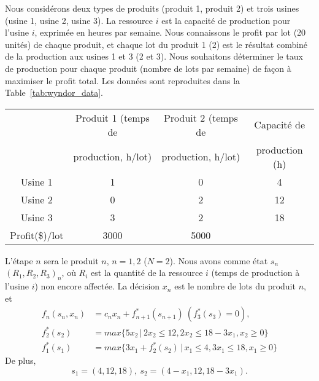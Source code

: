 \begin{example}
Nous considérons deux types de produits (produit 1, produit 2) et trois usines (usine 1, usine 2, usine 3).
La ressource $i$ est la capacité de production pour l’usine $i$, exprimée en heures par semaine.
Nous connaissons le profit par lot (20 unités) de chaque produit, et chaque lot du produit 1 (2) est le résultat combiné de la production aux usines 1 et 3 (2 et 3).
Nous souhaitons déterminer le taux de production pour chaque produit (nombre de lots par semaine) de façon à maximiser le profit total.
Les données sont reproduites dans la Table~\ref{tab:wyndor_data}.
\begin{table}[htb]
\begin{tabular}{|c|c|c|c|}
\hline
& Produit 1 (temps de & Produit 2 (temps de & Capacité de \\
& production, h/lot) & production, h/lot) & production (h) \\
\hline
Usine 1 & 1 & 0 & 4 \\
\hline
Usine 2 & 0 & 2 & 12 \\
\hline
Usine 3 & 3 & 2 & 18 \\
\hline
Profit(\$)/lot & 3000 & 5000 & \\
\hline
\end{tabular}
\end{table}
L'étape $n$ sera le produit $n$, $n = 1,2$ ($N = 2$).
Nous avons comme état $s_n$ $(R_1,R_2,R_3)_n$, où $R_i$ est la quantité de la ressource $i$ (temps de production à l’usine $i$) non encore affectée.
La décision $x_n$ est le nombre de lots du produit $n$, et
\begin{align*}
 f_n(s_n,x_n) &= c_nx_n + f_{n+1}^*(s_{n+1})\ (f_3^*(s_3) = 0),\\
 f_2^*(s_2) &= max \lbrace 5x_2\,|\,2x_2 \leq12, 2x_2 \leq 18 - 3x_1, x_2 \geq 0 \rbrace \\
 f_1^*(s_1) &= max \lbrace 3x_1+f_2^*(s_2)\,|\,x_1 \leq 4, 3x_1 \leq 18, x_1 \geq 0 \rbrace
\end{align*}
De plus,
\[
 s_1= (4,12,18),\ s_2 = (4-x_1,12,18-3x_1).
\]


\end{example}
